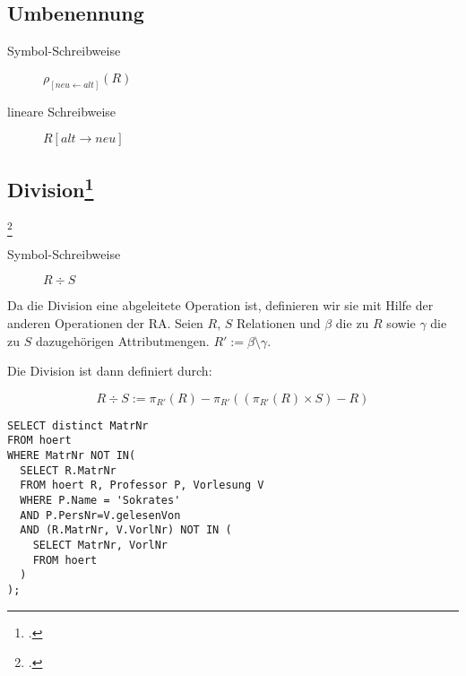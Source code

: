 \documentclass{lehramt-informatik-haupt}
\begin{document}
%

\subsection{Umbenennung}

\begin{description}
\item[Symbol-Schreibweise] $\rho_{[{neu}\leftarrow alt]} (R)$
\item[lineare Schreibweise] $R[alt\rightarrow neu]$
\end{description}

%

\subsection{Division\footcite[Division]{wiki:relationale-algebra}}

\footcite[Seite 31-43]{db:fs:2}

\begin{description}
\item[Symbol-Schreibweise] $R \div S$
\end{description}

\noindent
Da die Division eine abgeleitete Operation ist, definieren wir sie mit
Hilfe der anderen Operationen der RA. Seien $R$, $S$ Relationen und
$\beta$ die zu $R$ sowie $\gamma$ die zu $S$ dazugehörigen
Attributmengen. $R':=\beta \setminus \gamma$.

Die Division ist dann definiert durch:

\begin{displaymath}
R\div S :=
\pi_{R'}(R) -
\pi_{R'}((\pi_{R'}(R) \times S) - R)
\end{displaymath}

\begin{verbatim}
SELECT distinct MatrNr
FROM hoert
WHERE MatrNr NOT IN(
  SELECT R.MatrNr
  FROM hoert R, Professor P, Vorlesung V
  WHERE P.Name = 'Sokrates'
  AND P.PersNr=V.gelesenVon
  AND (R.MatrNr, V.VorlNr) NOT IN (
    SELECT MatrNr, VorlNr
    FROM hoert
  )
);
\end{verbatim}

%
\end{document}
